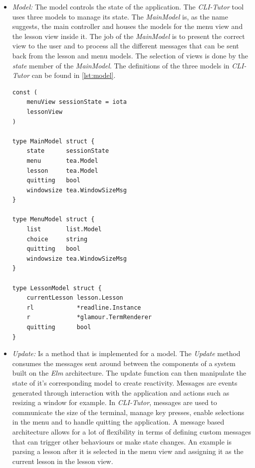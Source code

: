 \begin{itemize}
    \item \textit{Model:} The model controls the state of the application. The 
        \textit{CLI-Tutor} tool uses three models to manage its state. The
        \textit{MainModel} is, as the name suggests, the main controller and
        houses the models for the menu view and the lesson view inside it. The
        job of the \textit{MainModel} is to present the correct view to the
        user and to process all the different messages that can be sent back
        from the lesson and menu models. The selection of views is done by the \textit{state} member of the \textit{MainModel}.  The definitions of the three models in \textit{CLI-Tutor} can be found in \autoref{lst:model}.

\begin{lstlisting}[label=lst:model, frame=single, caption=Models used to build the user interface of \textit{CLI-Tutor} ]
const (
	menuView sessionState = iota
	lessonView
)

type MainModel struct {
	state      sessionState
	menu       tea.Model
	lesson     tea.Model
	quitting   bool
	windowsize tea.WindowSizeMsg
}

type MenuModel struct {
	list       list.Model
	choice     string
	quitting   bool
	windowsize tea.WindowSizeMsg
}

type LessonModel struct {
	currentLesson lesson.Lesson
	rl            *readline.Instance
	r             *glamour.TermRenderer
	quitting      bool
}
\end{lstlisting}

\item \textit{Update:} Is a method that is implemented for a model. The
    \textit{Update} method consumes the messages sent around between the
    components of a system built on the \textit{Elm} architecture. The update
    function can then manipulate the state of it's corresponding model to
    create reactivity. Messages are events generated through interaction with
    the application and actions such as resizing a window for example. In
    \textit{CLI-Tutor}, messages are used to communicate the size of the
    terminal, manage key presses, enable selections in the menu and to handle
    quitting the application. A message based architecture allows for a lot of
    flexibility in terms of defining custom messages that can trigger other
    behaviours or make state changes. An example is parsing a lesson after it
    is selected in the menu view and assigning it as the current lesson in the
    lesson view.


\end{itemize}
